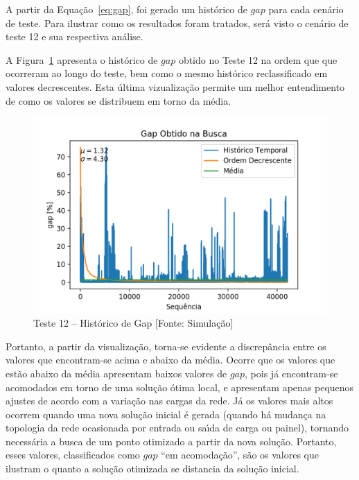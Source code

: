 A partir da Equa{\c c}{\~a}o~\ref{eq:gap}, foi gerado um hist{\'o}rico de $gap$ para cada cen{\'a}rio de teste. Para ilustrar como os resultados foram tratados, ser{\'a} visto o cen{\'a}rio de teste 12 e sua respectiva an{\'a}lise.

A Figura~\ref{fig:Teste_12.hist} apresenta o hist{\'o}rico de $gap$ obtido no Teste 12 na ordem que que ocorreram ao longo do teste, bem como o mesmo hist{\'o}rico reclassificado em valores decrescentes. Esta {\'u}ltima vizualiza{\c c}{\~a}o permite um melhor entendimento de como os valores se distribuem em torno da m{\'e}dia.

\begin{figure}[!h]
	\centering
	\includegraphics[width=1.0\linewidth]{figuras/hist}
	\caption[Teste 12 \--- Hist{\'o}rico de $gap$]{Teste 12 \--- Hist{\'o}rico de Gap [Fonte: Simula{\c c}{\~a}o]}
	\label{fig:Teste_12.hist}
\end{figure}

Portanto, a partir da visualiza{\c c}{\~a}o, torna-se evidente a discrep{\^a}ncia entre os valores que encontram-se acima e abaixo da m{\'e}dia. Ocorre que os valores que est{\~a}o abaixo da m{\'e}dia apresentam baixos valores de $gap$, pois j{\'a} encontram-se acomodados em torno de uma solu{\c c}{\~a}o {\'o}tima local, e apresentam apenas pequenos ajustes de acordo com a varia{\c c}{\~a}o nas cargas da rede. J{\'a} os valores mais altos ocorrem quando uma nova solu{\c c}{\~a}o inicial {\'e} gerada (quando h{\'a} mudan{\c c}a na topologia da rede ocasionada por entrada ou sa{\'\i}da de carga ou painel), tornando necess{\'a}ria a busca de um ponto otimizado a partir da nova solu{\c c}{\~a}o. Portanto, esses valores, classificados como $gap$ ``em acomoda{\c c}{\~a}o'', s{\~a}o os valores que ilustram o quanto a solu{\c c}{\~a}o otimizada se distancia da solu{\c c}{\~a}o inicial.

